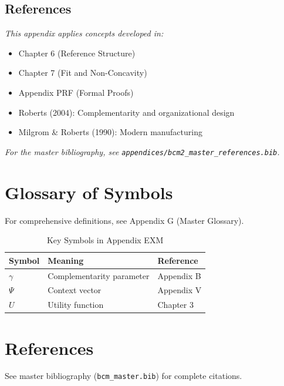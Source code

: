 
\subsection{References}

\noindent\textit{This appendix applies concepts developed in:}

\begin{itemize}[nosep]
    \item Chapter 6 (Reference Structure)
    \item Chapter 7 (Fit and Non-Concavity)
    \item Appendix PRF (Formal Proofs)
    \item Roberts (2004): Complementarity and organizational design
    \item Milgrom \& Roberts (1990): Modern manufacturing
\end{itemize}

\noindent\textit{For the master bibliography, see \texttt{appendices/bcm2\_master\_references.bib}.}



\nocite{bcm_master}



\section{Glossary of Symbols}
\label{sec:exm-glossary}

For comprehensive definitions, see Appendix G (Master Glossary).

\begin{table}[htbp]
\centering
\caption{Key Symbols in Appendix EXM}
\begin{tabular}{lll}
\toprule
\textbf{Symbol} & \textbf{Meaning} & \textbf{Reference} \\
\midrule
$\gamma$ & Complementarity parameter & Appendix B \\
$\Psi$ & Context vector & Appendix V \\
$U$ & Utility function & Chapter 3 \\
\bottomrule
\end{tabular}
\end{table}


\section{References}
\label{sec:exm-references}

See master bibliography (\texttt{bcm\_master.bib}) for complete citations.

\nocite{bcm_master}

